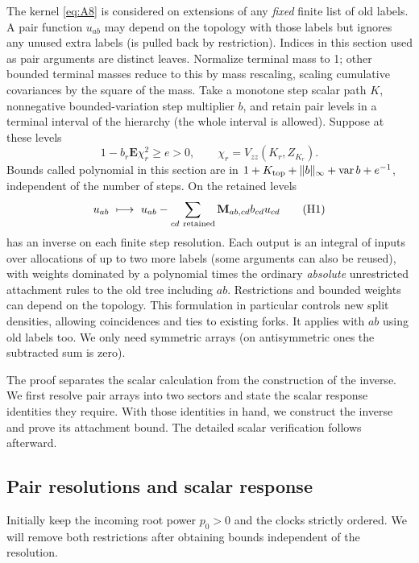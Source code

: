 \begin{proposition}
\label{inv:pair-inverse}
The kernel \eqref{eq:A8} is considered on extensions of any \emph{fixed} finite list of old labels. A pair function \(u_{ab}\) may depend on the topology with those labels but ignores any unused extra labels (is pulled back by restriction). Indices in this section used as pair arguments are distinct leaves. Normalize terminal mass to 1; other bounded terminal masses reduce to this by mass rescaling, scaling cumulative covariances by the square of the mass. Take a monotone step scalar path \(K\), nonnegative bounded-variation step multiplier \(b\), and retain pair levels in a terminal interval of the hierarchy (the whole interval is allowed). Suppose at these levels
\[
 1-b_r\mathbf E\chi_r^2\ge e>0,\qquad \chi_r=V_{zz}(K_r,Z_{K_r}).
\]
Bounds called polynomial in this section are in \(1+K_{\rm top}+\|b\|_\infty+\operatorname{var}b+e^{-1}\), independent of the number of steps. On the retained levels
\[
 u_{ab}\ \longmapsto\ u_{ab}-\sum_{cd\ {\rm retained}}{\bf M}_{ab,cd} b_{cd}u_{cd}
                                                                     \tag{H1}\label{eq:H1}
\]
has an inverse on each finite step resolution. Each output is an integral of inputs over allocations of up to two more labels (some arguments can also be reused), with weights dominated by a polynomial times the ordinary \emph{absolute} unrestricted attachment rules to the old tree including \(ab\). Restrictions and bounded weights can depend on the topology. This formulation in particular controls new split densities, allowing coincidences and ties to existing forks. It applies with \(ab\) using old labels too. We only need symmetric arrays (on antisymmetric ones the subtracted sum is zero).

\end{proposition}

The proof separates the scalar calculation from the construction of the
inverse. We first resolve pair arrays into two sectors and state the
scalar response identities they require. With those identities in hand,
we construct the inverse and prove its attachment bound. The detailed
scalar verification follows afterward.

\subsection{Pair resolutions and scalar response}

Initially keep the incoming root power \(p_0>0\) and the clocks
strictly ordered. We will remove both restrictions after obtaining
bounds independent of the resolution.

